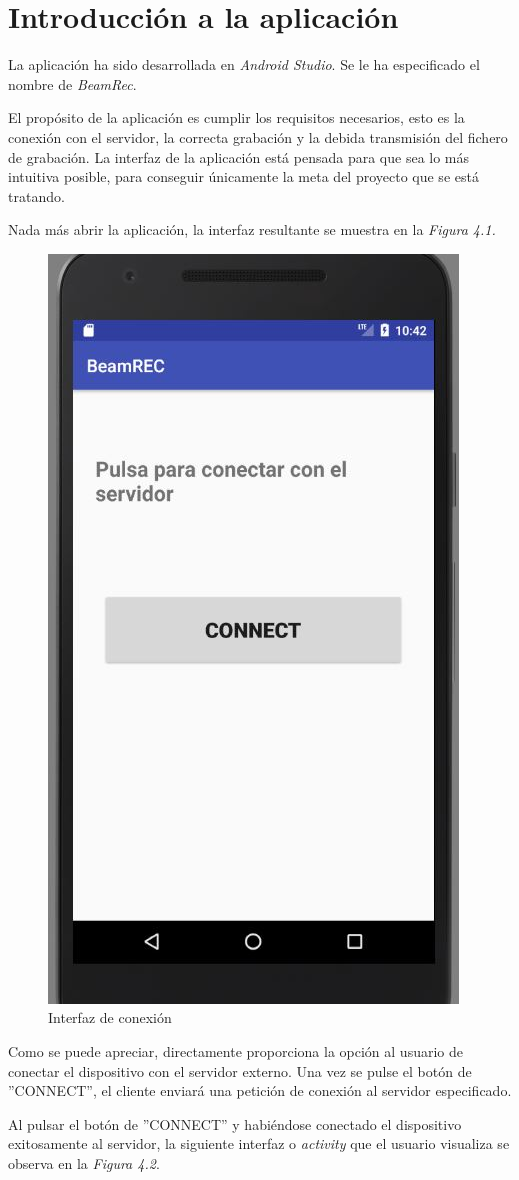\documentclass[a4paper,11pt]{book}
\begin{document}
	\section{Introducción a la aplicación}
	La aplicación ha sido desarrollada en \textit{Android Studio}. Se le ha especificado el nombre de \textit{BeamRec}.
	
	El propósito de la aplicación es cumplir los requisitos necesarios, esto es la conexión con el servidor, la correcta grabación y la debida transmisión del fichero de grabación. La interfaz de la aplicación está pensada para que sea lo más intuitiva posible, para conseguir únicamente la meta del proyecto que se está tratando.
	
	Nada más abrir la aplicación, la interfaz resultante se muestra en la \textit{Figura 4.1.}
	\begin{figure}[hbtp]
	\centering
	\includegraphics[width = 5 cm]{FIGURAS/interfaz1.JPG}
	\caption{Interfaz de conexión}
	\end{figure}
Como se puede apreciar, directamente proporciona la opción al usuario de conectar el dispositivo con el servidor externo. Una vez se pulse el botón de ''CONNECT'', el cliente enviará una petición de conexión al servidor especificado.
	
	Al pulsar el botón de ''CONNECT'' y habiéndose conectado el dispositivo exitosamente al servidor, la siguiente interfaz o \textit{activity} que el usuario visualiza se observa en la \textit{Figura 4.2}.
\end{document}
